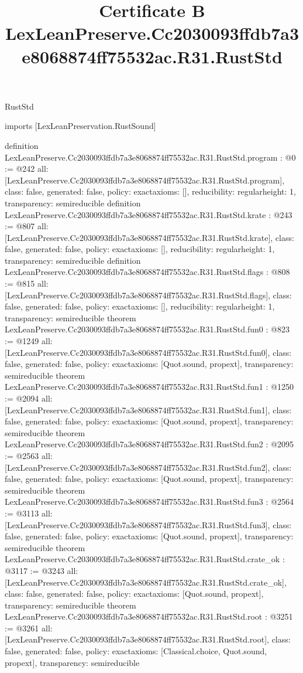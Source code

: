 \begin{lexlean}{RustStd}
\title{Certificate B LexLeanPreserve.Cc2030093ffdb7a3e8068874ff75532ac.R31.RustStd}
\begin{coremodule}
imports [LexLeanPreservation.RustSound]

definition LexLeanPreserve.Cc2030093ffdb7a3e8068874ff75532ac.R31.RustStd.program : @0 := @242 {
  all: [LexLeanPreserve.Cc2030093ffdb7a3e8068874ff75532ac.R31.RustStd.program],
  class: false,
  generated: false,
  policy: exact{axioms: []},
  reducibility: regular{height: 1},
  transparency: semireducible
}
definition LexLeanPreserve.Cc2030093ffdb7a3e8068874ff75532ac.R31.RustStd.krate : @243 := @807 {
  all: [LexLeanPreserve.Cc2030093ffdb7a3e8068874ff75532ac.R31.RustStd.krate],
  class: false,
  generated: false,
  policy: exact{axioms: []},
  reducibility: regular{height: 1},
  transparency: semireducible
}
definition LexLeanPreserve.Cc2030093ffdb7a3e8068874ff75532ac.R31.RustStd.flags : @808 := @815 {
  all: [LexLeanPreserve.Cc2030093ffdb7a3e8068874ff75532ac.R31.RustStd.flags],
  class: false,
  generated: false,
  policy: exact{axioms: []},
  reducibility: regular{height: 1},
  transparency: semireducible
}
theorem LexLeanPreserve.Cc2030093ffdb7a3e8068874ff75532ac.R31.RustStd.fun0 : @823 := @1249 {
  all: [LexLeanPreserve.Cc2030093ffdb7a3e8068874ff75532ac.R31.RustStd.fun0],
  class: false,
  generated: false,
  policy: exact{axioms: [Quot.sound, propext]},
  transparency: semireducible
}
theorem LexLeanPreserve.Cc2030093ffdb7a3e8068874ff75532ac.R31.RustStd.fun1 : @1250 := @2094 {
  all: [LexLeanPreserve.Cc2030093ffdb7a3e8068874ff75532ac.R31.RustStd.fun1],
  class: false,
  generated: false,
  policy: exact{axioms: [Quot.sound, propext]},
  transparency: semireducible
}
theorem LexLeanPreserve.Cc2030093ffdb7a3e8068874ff75532ac.R31.RustStd.fun2 : @2095 := @2563 {
  all: [LexLeanPreserve.Cc2030093ffdb7a3e8068874ff75532ac.R31.RustStd.fun2],
  class: false,
  generated: false,
  policy: exact{axioms: [Quot.sound, propext]},
  transparency: semireducible
}
theorem LexLeanPreserve.Cc2030093ffdb7a3e8068874ff75532ac.R31.RustStd.fun3 : @2564 := @3113 {
  all: [LexLeanPreserve.Cc2030093ffdb7a3e8068874ff75532ac.R31.RustStd.fun3],
  class: false,
  generated: false,
  policy: exact{axioms: [Quot.sound, propext]},
  transparency: semireducible
}
theorem LexLeanPreserve.Cc2030093ffdb7a3e8068874ff75532ac.R31.RustStd.crate_ok : @3117 := @3243 {
  all: [LexLeanPreserve.Cc2030093ffdb7a3e8068874ff75532ac.R31.RustStd.crate_ok],
  class: false,
  generated: false,
  policy: exact{axioms: [Quot.sound, propext]},
  transparency: semireducible
}
theorem LexLeanPreserve.Cc2030093ffdb7a3e8068874ff75532ac.R31.RustStd.root : @3251 := @3261 {
  all: [LexLeanPreserve.Cc2030093ffdb7a3e8068874ff75532ac.R31.RustStd.root],
  class: false,
  generated: false,
  policy: exact{axioms: [Classical.choice, Quot.sound, propext]},
  transparency: semireducible
}


\end{coremodule}
\end{lexlean}
